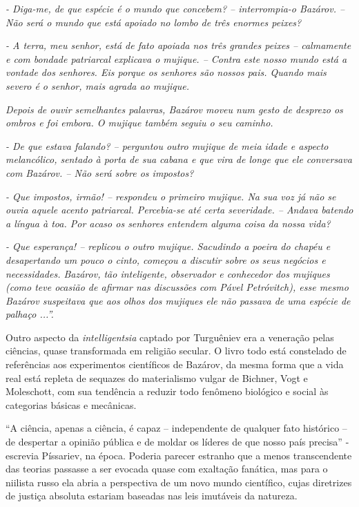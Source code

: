\emph{- Diga-me, de que espécie é o mundo que concebem? -- interrompia-o
Bazárov. -- Não será o mundo que está apoiado no lombo de três enormes
peixes?}

\emph{- A terra, meu senhor, está de fato apoiada nos três grandes
peixes -- calmamente e com bondade patriarcal explicava o mujique. --
Contra este nosso mundo está a vontade dos senhores. Eis porque os
senhores são nossos pais. Quando mais severo é o senhor, mais agrada ao
mujique. }

\emph{Depois de ouvir semelhantes palavras, Bazárov moveu num gesto de
desprezo os ombros e foi embora. O mujique também seguiu o seu caminho.}

\emph{- De que estava falando? -- perguntou outro mujique de meia idade
e aspecto melancólico, sentado à porta de sua cabana e que vira de longe
que ele conversava com Bazárov. -- Não será sobre os impostos?}

\emph{- Que impostos, irmão! -- respondeu o primeiro mujique. Na sua voz
já não se ouvia aquele acento patriarcal. Percebia-se até certa
severidade. -- Andava batendo a língua à toa. Por acaso os senhores
entendem alguma coisa da nossa vida?}

\emph{- Que esperança! -- replicou o outro mujique. Sacudindo a poeira
do chapéu e desapertando um pouco o cinto, começou a discutir sobre os
seus negócios e necessidades. Bazárov, tão inteligente, observador e
conhecedor dos mujiques (como teve ocasião de afirmar nas discussões com
Pável Petróvitch), esse mesmo Bazárov suspeitava que aos olhos dos
mujiques ele não passava de uma espécie de palhaço ...''.}

Outro aspecto da \emph{intelligentsia} captado por Turguêniev era a
veneração pelas ciências, quase transformada em religião secular. O
livro todo está constelado de referências aos experimentos científicos
de Bazárov, da mesma forma que a vida real está repleta de sequazes do
materialismo vulgar de Bichner, Vogt e Moleschott, com sua tendência a
reduzir todo fenômeno biológico e social às categorias básicas e
mecânicas.

``A ciência, apenas a ciência, é capaz -- independente de qualquer fato
histórico -- de despertar a opinião pública e de moldar os líderes de
que nosso país precisa'' - escrevia Píssariev, na época. Poderia parecer
estranho que a menos transcendente das teorias passasse a ser evocada
quase com exaltação fanática, mas para o niilista russo ela abria a
perspectiva de um novo mundo científico, cujas diretrizes de justiça
absoluta estariam baseadas nas leis imutáveis da natureza.

